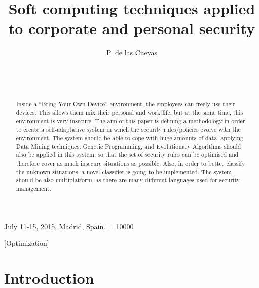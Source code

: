 \documentclass{sig-alternate}
\begin{document}
 {July 11-15, 2015, Madrid, Spain.}
\widowpenalty = 10000

\title{Soft computing techniques applied to corporate and personal security}

\author{
\alignauthor
P. de las Cuevas\\
\\
\\
\\
}

\maketitle

\begin{abstract}
Inside a ``Bring Your Own Device'' environment, the employees can freely use their devices. This allows them mix their personal and work life, but at the same time, this environment is very insecure. The aim of this paper is defining a methodology in order to create a self-adaptative system in which the security rules/policies evolve with the environment. The system should be able to cope with huge amounts of data, applying Data Mining techniques.
Genetic Programming, and Evolutionary Algorithms should also be applied in this system, so that the set of security rules can be optimised and therefore cover as much insecure situations as possible. Also, in order to better classify the unknown situations, a novel classifier is going to be implemented.
The system should be also multiplatform, as there are many different languages used for security management.
\end{abstract}

[Optimization]

\terms{}


%
%
\section{Introduction}
\label{sec:intro}
\end{document}
